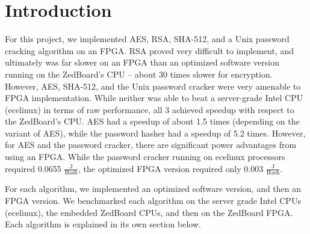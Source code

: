 \section{Introduction}
For this project, we implemented AES, RSA, SHA-512, and a Unix password cracking algorithm on an FPGA.
RSA proved very difficult to implement, and ultimately was far slower on an FPGA than an optimized software
version running on the ZedBoard's CPU -- about 30 times slower for encryption.
However, AES, SHA-512, and the Unix password cracker were very amenable
to FPGA implementation. While neither was able to beat a server-grade Intel CPU (ecelinux) in terms of raw performance,
all 3 achieved speedup with respect to the ZedBoard's CPU. AES had a speedup of about 1.5 times (depending on the variant of AES),
while the password hasher had a speedup of 5.2 times.
However, for AES and the password cracker, there are significant power advantages from using an FPGA.
While the password cracker running on ecelinux processors required 0.0655 $\frac{\text{J}}{\text{Hash}}$, the optimized
FPGA version required only 0.003 $\frac{\text{J}}{\text{Hash}}$.

For each algorithm, we implemented an optimized software version, and then an FPGA version.
We benchmarked each algorithm on the server grade Intel CPUs (ecelinux), the embedded ZedBoard CPUs,
and then on the ZedBoard FPGA. Each algorithm is explained in its own section below.
